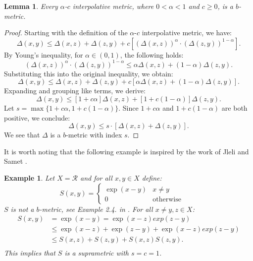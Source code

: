 \documentclass[pdflatex,sn-mathphys-num]{sn-jnl}%
\theoremstyle{thmstyleone}%
\newtheorem{lemma}{Lemma}%
\theoremstyle{thmstyletwo}%
\newtheorem{example}{Example}%
\theoremstyle{thmstylethree}%
\begin{document}
\begin{lemma} \label{not_new}
Every \(\alpha\)-\(c\) interpolative metric, where \(0<\alpha<1\) and \(c\ge 0\),  is a \(b\)-metric.
\end{lemma}
\begin{proof}
Starting with the definition of the \(\alpha\)-\(c\) interpolative metric, we have:
\[
\Delta(x, y) \leq \Delta(x, z) + \Delta(z, y) + c \left[ (\Delta(x, z))^\alpha \cdot (\Delta(z, y))^{1-\alpha} \right].
\]
By Young's inequality, for \( \alpha \in (0, 1) \), the following holds:
\[
(\Delta(x, z))^\alpha \cdot (\Delta(z, y))^{1-\alpha} \leq \alpha \Delta(x, z) + (1-\alpha) \Delta(z, y).
\]
Substituting this into the original inequality, we obtain:
\[
\Delta(x, y) \leq \Delta(x, z) + \Delta(z, y) + c \left[ \alpha \Delta(x, z) + (1-\alpha) \Delta(z, y) \right].
\]
Expanding and grouping like terms, we derive:
\[
\Delta(x, y) \leq \left[1 + c \alpha \right] \Delta(x, z) + \left[1 + c (1-\alpha) \right] \Delta(z, y).
\]
Let \( s = \max\{1 + c \alpha, 1 + c (1-\alpha)\} \). Since \( 1 + c \alpha \) and \( 1 + c (1-\alpha) \) are both positive, we conclude:
\[
\Delta(x, y) \leq s \cdot \left[ \Delta(x, z) + \Delta(z, y) \right].
\]
 We see that $\Delta$ is a \(b\)-metric with index \(s\).
\end{proof}
It is worth noting that the following example is inspired by the work of Jleli and Samet \cite{jleli2018new}.
\begin{example}\label{supexm}
Let \(X=\mathcal{R}\) and for all \(x,y\in X\) define:
\begin{equation*}
S(x,y) = \left\{
\begin{array}{rl}
    \exp(x-y)  &   x\not=y \\
    0\quad&\text{otherwise}
\end{array} \right. \qquad
\end{equation*}
\(S\) is not a \(b\)-metric, see Example 2.4. in  \cite{jleli2018new}. For all \(x\not = y,z\in X\):
\begin{align*}
S(x,y)&=\exp(x-y)=\exp(x-z)exp(z-y)\\
&\leq \exp(x-z)+\exp(z-y)+\exp(x-z)exp(z-y)\\
&\leq S(x,z)+S(z,y)+S(x,z)S(z,y).\\
\end{align*}
This implies that \(S\) is a suprametric with \(s=c=1\).
\end{example}
\end{document}
